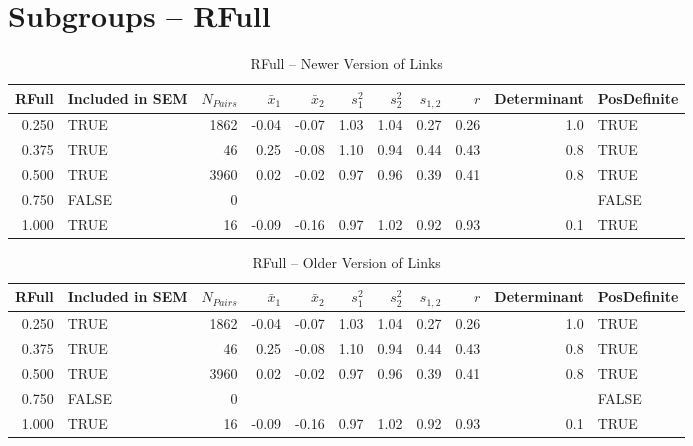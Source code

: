 \documentclass{article}\usepackage[]{graphicx}\usepackage[]{color}
\begin{document}
\section{Subgroups --  RFull }%
\begin{table}[ht]
\centering
\begin{tabular}{rlrrrrrrrrl}
  \hline
RFull & Included in SEM & $N_{Pairs}$ & $\bar{x}_1$ & $\bar{x}_2$ & $s_1^2$ & $s_2^2$ & $s_{1,2}$ & $r$ & Determinant & PosDefinite \\ 
  \hline
0.250 & TRUE & 1862 & -0.04 & -0.07 & 1.03 & 1.04 & 0.27 & 0.26 & 1.0 & TRUE \\ 
  0.375 & TRUE & 46 & 0.25 & -0.08 & 1.10 & 0.94 & 0.44 & 0.43 & 0.8 & TRUE \\ 
  0.500 & TRUE & 3960 & 0.02 & -0.02 & 0.97 & 0.96 & 0.39 & 0.41 & 0.8 & TRUE \\ 
  0.750 & FALSE & 0 &  &  &  &  &  &  &  & FALSE \\ 
  1.000 & TRUE & 16 & -0.09 & -0.16 & 0.97 & 1.02 & 0.92 & 0.93 & 0.1 & TRUE \\ 
   \hline
\end{tabular}
\caption{RFull -- Newer Version of Links} 
\end{table}
\begin{table}[ht]
\centering
\begin{tabular}{rlrrrrrrrrl}
  \hline
RFull & Included in SEM & $N_{Pairs}$ & $\bar{x}_1$ & $\bar{x}_2$ & $s_1^2$ & $s_2^2$ & $s_{1,2}$ & $r$ & Determinant & PosDefinite \\ 
  \hline
0.250 & TRUE & 1862 & -0.04 & -0.07 & 1.03 & 1.04 & 0.27 & 0.26 & 1.0 & TRUE \\ 
  0.375 & TRUE & 46 & 0.25 & -0.08 & 1.10 & 0.94 & 0.44 & 0.43 & 0.8 & TRUE \\ 
  0.500 & TRUE & 3960 & 0.02 & -0.02 & 0.97 & 0.96 & 0.39 & 0.41 & 0.8 & TRUE \\ 
  0.750 & FALSE & 0 &  &  &  &  &  &  &  & FALSE \\ 
  1.000 & TRUE & 16 & -0.09 & -0.16 & 0.97 & 1.02 & 0.92 & 0.93 & 0.1 & TRUE \\ 
   \hline
\end{tabular}
\caption{RFull -- Older Version of Links} 
\end{table}
\end{document}
